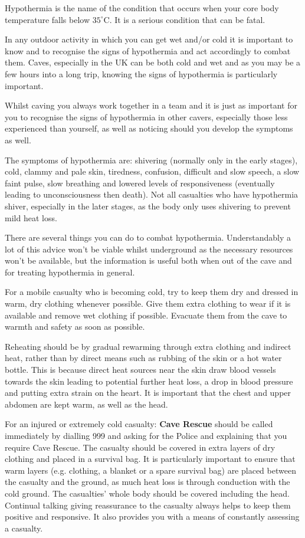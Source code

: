 \documentclass[a4paper,11pt]{article}
\begin{document}
Hypothermia is the name of the condition that occurs when your core body
temperature falls below ${\textrm{35}}^{\circ}$C. It is a serious condition that can be fatal.

In any outdoor activity in which you can get wet and/or cold it is important to
know and to recognise the signs of hypothermia and act accordingly to combat
them. Caves, especially in the UK can be both cold and wet and as you may be a
few hours into a long trip, knowing the signs of hypothermia is particularly
important.

Whilst caving you always work together in a team and it is just as important
for you to recognise the signs of hypothermia in other cavers, especially those
less experienced than yourself, as well as noticing should you develop the
symptoms as well.

The symptoms of hypothermia are: shivering (normally only in the early stages),
cold, clammy and pale skin, tiredness, confusion, difficult and slow speech, a
slow faint pulse, slow breathing and lowered levels of responsiveness
(eventually leading to unconsciousness then death). Not all casualties who have
hypothermia shiver, especially in the later stages, as the body only uses
shivering to prevent mild heat loss.

There are several things you can do to combat hypothermia. Understandably a lot
of this advice won't be viable whilst underground as the necessary resources
won't be available, but the information is useful both when out of the cave and
for treating hypothermia in general.

For a mobile casualty who is becoming cold, try to keep them dry and dressed in
warm, dry clothing whenever possible. Give them extra clothing to wear if it is
available and remove wet clothing if possible. Evacuate them from the cave to
warmth and safety as soon as possible.

Reheating should be by gradual rewarming through extra clothing and indirect
heat, rather than by direct means such as rubbing of the skin or a hot water
bottle. This is because direct heat sources near the skin draw blood vessels
towards the skin leading to potential further heat loss, a drop in blood
pressure and putting extra strain on the heart. It is important that the chest
and upper abdomen are kept warm, as well as the head.

For an injured or extremely cold casualty: {\bf Cave Rescue} should be called
immediately by dialling 999 and asking for the Police and explaining that you
require Cave Rescue.   The casualty should be covered in extra layers of dry
clothing and placed in a survival bag. It is particularly important to ensure
that warm layers (e.g.  clothing, a blanket or a spare survival bag) are placed
between the casualty and the ground, as much heat loss is through conduction
with the cold ground.  The casualties' whole body should be covered including
the head.  Continual talking giving reassurance to the casualty always helps to
keep them positive and responsive. It also provides you with a means of
constantly assessing a casualty.
\end{document}
